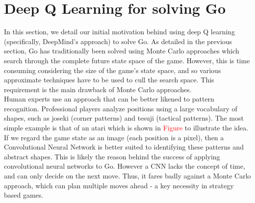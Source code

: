 
\section{Deep Q Learning for solving Go}
In this section, we detail our initial motivation behind using deep Q learning (specifically, DeepMind's approach) to solve Go. As detailed in the previous section, Go has traditionally been solved using Monte Carlo approaches which search through the complete future state space of the game. However, this is time consuming considering the size of the game's state space, and so various approximate techniques have to be used to cull the search space. This requirement is the main drawback of Monte Carlo approaches. 
\\
Human experts use an approach that can be better likened to pattern recognition. Professional players analyze positions using a large vocabulary of shapes, such as joseki (corner patterns) and tesuji (tactical patterns). The most simple example is that of an atari which is shown in \textcolor{red}{Figure } to illustrate the idea. If we regard the game state as an image (each position is a pixel), then a Convolutional Neural Network is better suited to identifying these patterns and abstract shapes. This is likely the reason behind the success of applying convolutional neural networks to Go. However a CNN lacks the concept of time, and can only decide on the next move. Thus, it fares badly against a Monte Carlo approach, which can plan multiple moves ahead - a key necessity in strategy based games.
\\
